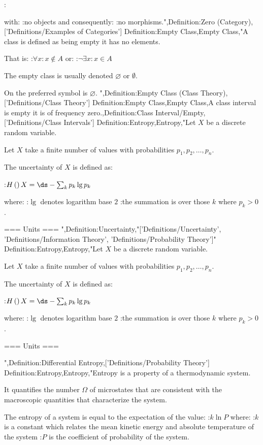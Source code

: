:$\qquad$


with:
:no objects
and consequently:
:no morphisms.",Definition:Zero (Category),['Definitions/Examples of Categories']
Definition:Empty Class,Empty Class,"A class is defined as being empty  it has no elements.

That is:
:$\forall x: x \notin A$
or:
:$\neg \exists x: x \in A$


The empty class is usually denoted $\varnothing$ or $\emptyset$.

On  the preferred symbol is $\varnothing$.
",Definition:Empty Class (Class Theory),['Definitions/Class Theory']
Definition:Empty Class,Empty Class,A class interval is empty  it is of frequency zero.,Definition:Class Interval/Empty,['Definitions/Class Intervals']
Definition:Entropy,Entropy,"Let $X$ be a discrete random variable.

Let $X$ take a finite number of values with probabilities $p_1, p_2, \dotsc, p_n$.


The uncertainty of $X$ is defined as:

:$H \left(   \right)X = \ds -\sum_k p_k \lg p_k$

where:
:$\lg$ denotes logarithm base $2$
:the summation is over those $k$ where $p_k > 0$.


=== Units ===
",Definition:Uncertainty,"['Definitions/Uncertainty', 'Definitions/Information Theory', 'Definitions/Probability Theory']"
Definition:Entropy,Entropy,"Let $X$ be a discrete random variable.

Let $X$ take a finite number of values with probabilities $p_1, p_2, \dotsc, p_n$.


The uncertainty of $X$ is defined as:

:$H \left(   \right)X = \ds -\sum_k p_k \lg p_k$

where:
:$\lg$ denotes logarithm base $2$
:the summation is over those $k$ where $p_k > 0$.


=== Units ===

",Definition:Differential Entropy,['Definitions/Probability Theory']
Definition:Entropy,Entropy,"Entropy is a property of a thermodynamic system.

It quantifies the number $\Omega$ of microstates that are consistent with the macroscopic quantities that characterize the system.


The entropy of a system is equal to the expectation of the value:
:$k \ln P$
where:
:$k$ is a constant which relates the mean kinetic energy and absolute temperature of the system
:$P$ is the coefficient of probability of the system.



